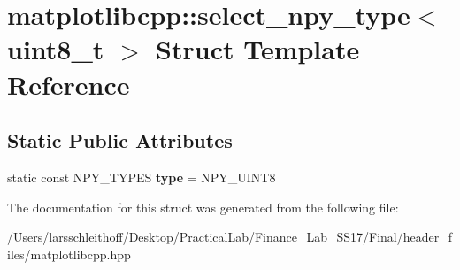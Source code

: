 \hypertarget{structmatplotlibcpp_1_1select__npy__type_3_01uint8__t_01_4}{}\section{matplotlibcpp\+:\+:select\+\_\+npy\+\_\+type$<$ uint8\+\_\+t $>$ Struct Template Reference}
\label{structmatplotlibcpp_1_1select__npy__type_3_01uint8__t_01_4}
\subsection*{Static Public Attributes}
\begin{DoxyCompactItemize}
\item 
\mbox{\label{structmatplotlibcpp_1_1select__npy__type_3_01uint8__t_01_4_a6e80bfd252a69f14ff869c8b4fbb9e54}} 
static const N\+P\+Y\+\_\+\+T\+Y\+P\+ES {\bfseries type} = N\+P\+Y\+\_\+\+U\+I\+N\+T8
\end{DoxyCompactItemize}


The documentation for this struct was generated from the following file\+:\begin{DoxyCompactItemize}
\item 
/\+Users/larsschleithoff/\+Desktop/\+Practical\+Lab/\+Finance\+\_\+\+Lab\+\_\+\+S\+S17/\+Final/header\+\_\+files/matplotlibcpp.\+hpp\end{DoxyCompactItemize}
